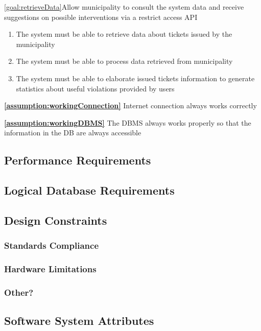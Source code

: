 \begin{description}
   		\item \ref{goal:retrieveData}Allow municipality to consult the system data and receive suggestions on possible interventions via a restrict access API 
   				\begin{enumerate}[resume*] 
  				\item The system must be able to retrieve data about tickets issued by the municipality 
   				\item The system must be able to process data retrieved from municipality
   				\item The system must be able to elaborate issued tickets information to generate statistics about useful violations provided by users
   			\end{enumerate}
   			
   			\textbf{\ref{assumption:workingConnection}} Internet connection always works correctly
   			
			\textbf{\ref{assumption:workingDBMS}} The DBMS always works properly so that the information in the DB are always accessible

   	\end{description}

\subsection{Performance Requirements}

\subsection{Logical Database Requirements}

\subsection{Design Constraints}

\subsubsection{Standards Compliance}
\subsubsection{Hardware Limitations}
\subsubsection{Other?}

\subsection{Software System Attributes}

